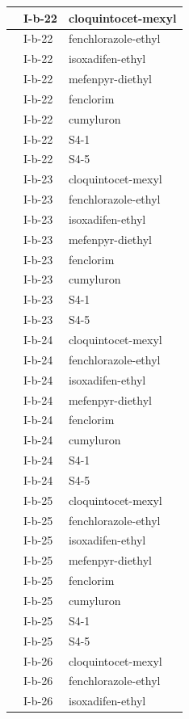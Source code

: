 \documentclass[11pt,a4paper]{article}
\begin{document}
\begin{table}[h]
\begin{tabular}{|l|l|l|}
 & I-b-22 & cloquintocet-mexyl \\ \hline
 & I-b-22 & fenchlorazole-ethyl \\ \hline
 & I-b-22 & isoxadifen-ethyl \\ \hline
 & I-b-22 & mefenpyr-diethyl \\ \hline
 & I-b-22 & fenclorim \\ \hline
 & I-b-22 & cumyluron \\ \hline
 & I-b-22 & S4-1 \\ \hline
 & I-b-22 & S4-5 \\ \hline
 & I-b-23 & cloquintocet-mexyl \\ \hline
 & I-b-23 & fenchlorazole-ethyl \\ \hline
 & I-b-23 & isoxadifen-ethyl \\ \hline
 & I-b-23 & mefenpyr-diethyl \\ \hline
 & I-b-23 & fenclorim \\ \hline
 & I-b-23 & cumyluron \\ \hline
 & I-b-23 & S4-1 \\ \hline
 & I-b-23 & S4-5 \\ \hline
 & I-b-24 & cloquintocet-mexyl \\ \hline
 & I-b-24 & fenchlorazole-ethyl \\ \hline
 & I-b-24 & isoxadifen-ethyl \\ \hline
 & I-b-24 & mefenpyr-diethyl \\ \hline
 & I-b-24 & fenclorim \\ \hline
 & I-b-24 & cumyluron \\ \hline
 & I-b-24 & S4-1 \\ \hline
 & I-b-24 & S4-5 \\ \hline
 & I-b-25 & cloquintocet-mexyl \\ \hline
 & I-b-25 & fenchlorazole-ethyl \\ \hline
 & I-b-25 & isoxadifen-ethyl \\ \hline
 & I-b-25 & mefenpyr-diethyl \\ \hline
 & I-b-25 & fenclorim \\ \hline
 & I-b-25 & cumyluron \\ \hline
 & I-b-25 & S4-1 \\ \hline
 & I-b-25 & S4-5 \\ \hline
 & I-b-26 & cloquintocet-mexyl \\ \hline
 & I-b-26 & fenchlorazole-ethyl \\ \hline
 & I-b-26 & isoxadifen-ethyl \\ \hline

\end{tabular}
\end{table}
\end{document}
